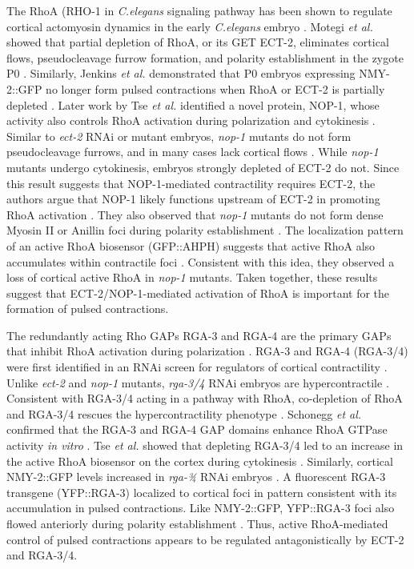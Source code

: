 \documentclass{ucetd}
\begin{document}
The RhoA (RHO-1 in \textit{C.elegans} signaling pathway has been shown to regulate cortical actomyosin dynamics in the early \textit{C.elegans} embryo \cite{Motegi:2006hi, Tse:2012fp}.  Motegi \textit{et al.} showed that partial depletion of RhoA, or its GET ECT-2, eliminates cortical flows, pseudocleavage furrow formation, and polarity establishment in the zygote P0 \cite{Motegi:2006hi}.  Similarly, Jenkins \textit{et al.} demonstrated that P0 embryos expressing NMY-2::GFP no longer form pulsed contractions when RhoA or ECT-2 is partially depleted \cite{Jenkins:2006cb}.  Later work by Tse \textit{et al.} identified a novel protein, NOP-1, whose activity also controls RhoA activation during polarization and cytokinesis \cite{Tse:2012fp}. Similar to \textit{ect-2} RNAi or mutant embryos, \textit{nop-1} mutants do not form pseudocleavage furrows, and in many cases lack cortical flows \cite{Tse:2012fp}.  While \textit{nop-1} mutants undergo cytokinesis, embryos strongly depleted of ECT-2 do not.  Since this result suggests that NOP-1-mediated contractility requires ECT-2, the authors argue that NOP-1 likely functions upstream of ECT-2 in promoting RhoA activation \cite{Tse:2012fp}.  They also observed that \textit{nop-1} mutants do not form dense Myosin II or Anillin foci during polarity establishment \cite{Tse:2012fp}.  The localization pattern of an active RhoA biosensor (GFP::AHPH) suggests that active RhoA also accumulates within contractile foci \cite{Tse:2012fp}.  Consistent with this idea, they observed a loss of cortical active RhoA in \textit{nop-1} mutants.  Taken together, these results suggest that ECT-2/NOP-1-mediated activation of RhoA is important for the formation of pulsed contractions.




The redundantly acting Rho GAPs RGA-3 and RGA-4 are the primary GAPs that inhibit RhoA activation during polarization \cite{Schmutz:2007jq, Schonegg:2007if}.  RGA-3 and RGA-4 (RGA-3/4) were first identified in an RNAi screen for regulators of cortical contractility \cite{Schmutz:2007jq}.  Unlike \textit{ect-2} and \textit{nop-1} mutants, \textit{rga-3/4} RNAi embryos are hypercontractile \cite{Schmutz:2007jq, Schonegg:2007if}.  Consistent with RGA-3/4 acting in a pathway with RhoA, co-depletion of RhoA and RGA-3/4 rescues the hypercontractility phenotype \cite{Schmutz:2007jq, Schonegg:2007if}.  Schonegg \textit{et al.} confirmed that the RGA-3 and RGA-4 GAP domains enhance RhoA GTPase activity \textit{in vitro} \cite{Schonegg:2007if}.  Tse \textit{et al.} showed that depleting RGA-3/4 led to an increase in the active RhoA biosensor on the cortex during cytokinesis \cite{Tse:2012fp}.  Similarly, cortical NMY-2::GFP levels increased in \textit{rga-¾} RNAi embryos \cite{Schonegg:2007if}.  A fluorescent RGA-3 transgene (YFP::RGA-3) localized to cortical foci in pattern consistent with its accumulation in pulsed contractions.  Like NMY-2::GFP, YFP::RGA-3 foci also flowed anteriorly during polarity establishment  \cite{Schonegg:2007if}.  Thus, active RhoA-mediated control of pulsed contractions appears to be regulated antagonistically by ECT-2 and RGA-3/4.
\end{document}
